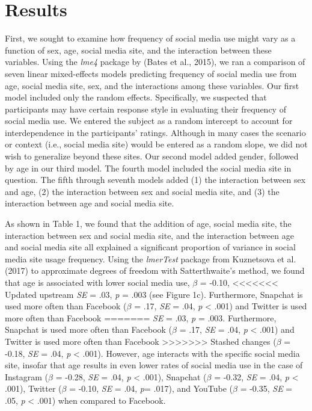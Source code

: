\documentclass[man, fleqn, noextraspace]{apa6}
\theoremstyle{definition}
\theoremstyle{definition}
\theoremstyle{definition}
\theoremstyle{remark}
\begin{document}
\section{Results}\label{results}

First, we sought to examine how frequency of social media use might vary
as a function of sex, age, social media site, and the interaction
between these variables. Using the \emph{lme4} package by (Bates et al.,
2015), we ran a comparison of seven linear mixed-effects models
predicting frequency of social media use from age, social media site,
sex, and the interactions among these variables. Our first model
included only the random effects. Specifically, we suspected that
participants may have certain response style in evaluating their
frequency of social media use. We entered the subject as a random
intercept to account for interdependence in the participants' ratings.
Although in many cases the scenario or context (i.e., social media site)
would be entered as a random slope, we did not wish to generalize beyond
these sites. Our second model added gender, followed by age in our third
model. The fourth model included the social media site in question. The
fifth through seventh models added (1) the interaction between sex and
age, (2) the interaction between sex and social media site, and (3) the
interaction between age and social media site.

As shown in Table 1, we found that the addition of age, social media
site, the interaction between sex and social media site, and the
interaction between age and social media site all explained a
significant proportion of variance in social media site usage frequency.
Using the \emph{lmerTest} package from Kuznetsova et al. (2017) to
approximate degrees of freedom with Satterthwaite's method, we found
that age is associated with lower social media use, \(\beta\) = -0.10,
<<<<<<< Updated upstream
\emph{SE} = .03, \emph{p} = .003 (see Figure 1c). Furthermore, Snapchat
is used more often than Facebook (\(\beta\) = .17, \emph{SE} = .04,
\emph{p} \textless{} .001) and Twitter is used more often than Facebook
=======
\emph{SE} = .03, \emph{p} = .003. Furthermore, Snapchat is used more
often than Facebook (\(\beta\) = .17, \emph{SE} = .04, \emph{p}
\textless{} .001) and Twitter is used more often than Facebook
>>>>>>> Stashed changes
(\(\beta\) = -0.18, \emph{SE} = .04, \emph{p} \textless{} .001).
However, age interacts with the specific social media site, insofar that
age results in even lower rates of social media use in the case of
Instagram (\(\beta\) = -0.28, \emph{SE} = .04, \emph{p} \textless{}
.001), Snapchat (\(\beta\) = -0.32, \emph{SE} = .04, \emph{p}
\textless{} .001), Twitter (\(\beta\) = -0.10, \emph{SE} = .04,
\emph{p}= .017), and YouTube (\(\beta\) = -0.35, \emph{SE} = .05,
\emph{p} \textless{} .001) when compared to Facebook.
\end{document}
